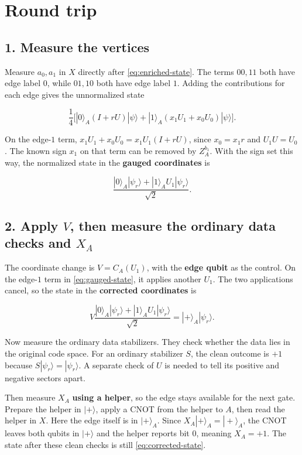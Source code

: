 \documentclass[11pt,a4paper]{article}
\begin{document}
\section*{Round trip}

\subsection*{1. Measure the vertices}

Measure \(a_0,a_1\) in \(X\) directly after \eqref{eq:enriched-state}. The terms \(00,11\) both
have edge label \(0\), while \(01,10\) both have edge label \(1\). Adding
the contributions for each edge gives the unnormalized state

\[
\frac14\Big[
 |0\rangle_A (I+rU)|\psi\rangle
+|1\rangle_A (x_1U_1+x_0U_0)|\psi\rangle
\Big].
\]

On the edge-\(1\) term, \(x_1U_1+x_0U_0=x_1U_1(I+rU)\), since
\(x_0=x_1r\) and \(U_1U=U_0\). The known sign \(x_1\) on that term can be
removed by \(Z_A^{b_1}\). With the sign set this way, the normalized state
in the \textbf{gauged coordinates} is

\begin{equation}
\label{eq:gauged-state}
\frac{|0\rangle_A|\psi_r\rangle+|1\rangle_A U_1|\psi_r\rangle}{\sqrt2}.
\end{equation}

\subsection*{2. Apply \(V\), then measure the ordinary data checks and \(X_A\)}

The coordinate change is \(V=C_A(U_1)\), with the \textbf{edge qubit} as the
control. On the edge-\(1\) term in \eqref{eq:gauged-state}, it applies another \(U_1\).
The two applications cancel, so the state in the \textbf{corrected coordinates} is

\begin{equation}
\label{eq:corrected-state}
V\frac{|0\rangle_A|\psi_r\rangle+|1\rangle_A U_1|\psi_r\rangle}{\sqrt2}
=|+\rangle_A|\psi_r\rangle.
\end{equation}

Now measure the ordinary data stabilizers. They check whether the data
lies in the original code space. For an ordinary stabilizer \(S\), the
clean outcome is \(+1\) because \(S|\psi_r\rangle=|\psi_r\rangle\).
A separate check of \(U\) is needed to tell its positive and negative
sectors apart.

Then measure \(X_A\) \textbf{using a helper}, so the edge stays available for
the next gate. Prepare the helper in \(|+\rangle\), apply a CNOT from
the helper to \(A\), then read the helper in \(X\). Here the edge itself is
in \(|+\rangle_A\). Since \(X_A|+\rangle_A=|+\rangle_A\), the CNOT leaves
both qubits in \(|+\rangle\) and the helper reports bit \(0\), meaning
\(X_A=+1\). The state after these clean checks is still \eqref{eq:corrected-state}.
\end{document}
